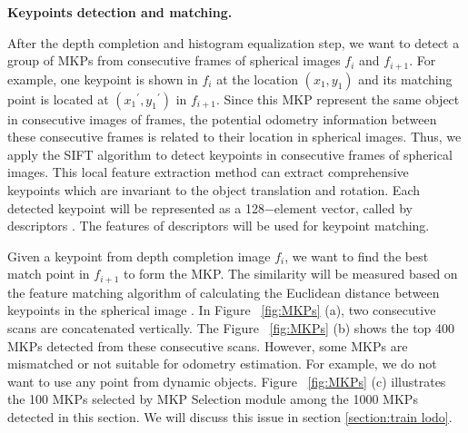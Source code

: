 \documentclass[sigconf]{acmart}
\newcommand{\bfsection}[1]{\vspace*{0.1cm}\noindent\textbf{#1.}}
\begin{document}
\bfsection{Keypoints detection and matching}

After the depth completion and histogram equalization step, we want to detect a group of MKPs from consecutive frames of spherical images $f_i$ and $f_{i+1}$. For example, one keypoint is shown in $f_i$ at the location $(x_1, y_1)$  and its matching point is located at $({x_1}^\prime, {y_1}^\prime)$ in $f_{i+1}$. Since this MKP represent the same object in consecutive images of frames, the potential odometry information between these consecutive frames is related to their location in spherical images. Thus, we apply the SIFT algorithm to detect keypoints in consecutive frames of spherical images. This local feature extraction method can extract comprehensive keypoints which are invariant to the object translation and rotation. Each detected keypoint will be represented as a 128$-$element vector, called by descriptors \cite{whensift}. The features of descriptors will be used for keypoint matching.

Given a keypoint from depth completion image  $f_i$, we want to find the best match point in $f_{i+1}$ to form the MKP. The similarity will be measured based on the feature matching algorithm of calculating the Euclidean distance between keypoints in the spherical image \cite{siftvo}. In Figure ~\ref{fig:MKPs} (a), two consecutive scans are concatenated vertically. The Figure ~\ref{fig:MKPs} (b) shows the top 400 MKPs detected from these consecutive scans. However, some MKPs are mismatched or not suitable for odometry estimation. For example, we do not want to use any point from dynamic objects. Figure ~\ref{fig:MKPs} (c) illustrates the 100 MKPs selected by MKP Selection module among the 1000 MKPs detected in this section. We will discuss this issue in section \ref{section:train lodo}.
\end{document}
